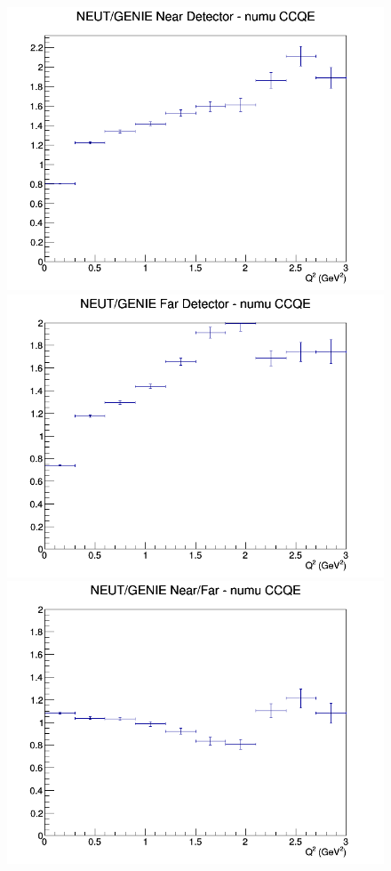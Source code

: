 \begin{figure}[h]
\endminipage
\newline
{}
\includegraphics[width=\linewidth]{eff_Q2/FGT/ratios/CCQE_NEUT_GENIE_numu_near_Q2.png}
\endminipage
{}
\includegraphics[width=\linewidth]{eff_Q2/FGT/ratios/CCQE_NEUT_GENIE_numu_far_Q2.png}
\endminipage
{}
\includegraphics[width=\linewidth]{eff_Q2/FGT/ratios/CCQE_NEUT_GENIE_numu_NF_Q2.png}

\end{figure}
